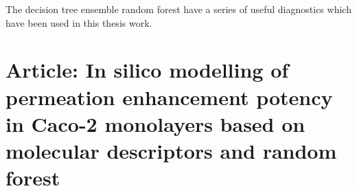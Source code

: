 The decision tree ensemble random forest have a series of useful diagnostics which have been used in this thesis work.

\section{Article: In silico modelling of permeation enhancement potency in Caco-2
monolayers based on molecular descriptors and random forest}

\newpage


